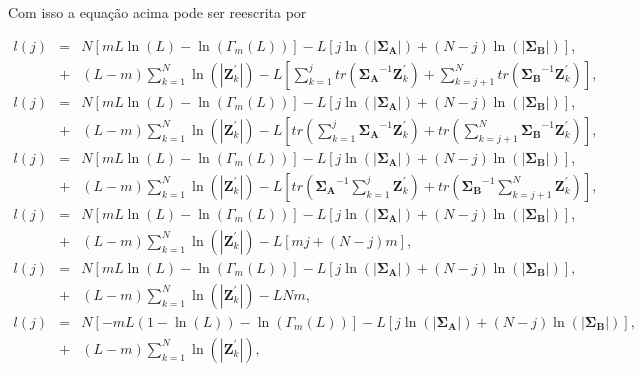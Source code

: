 Com isso a equação acima pode ser reescrita por

\begin{equation*}
\begin{array}{rcl}
	l(j)&=&N\left[mL\ln{\left(L\right)}-\ln{\left(\Gamma_m(L)\right)}\right]-L\left[j\ln{\left(|\mathbf{\Sigma_{A}}|\right)} +(N-j)\ln{\left(|\mathbf{\Sigma_{B}}|\right)}\right], \\
	&+&(L-m)\sum_{k=1}^{N}\ln{\left(|\mathbf{Z}_{k}^{'}|\right)}-L\left[\sum_{k=1}^{j}tr(\mathbf{\Sigma_{A}}^{-1}\mathbf{Z}_{k}^{'})+ \sum_{k=j+1}^{N}tr(\mathbf{\Sigma_{B}}^{-1}\mathbf{Z}_{k}^{'})\right], \\
	l(j)&=&N\left[mL\ln{\left(L\right)}-\ln{\left(\Gamma_m(L)\right)}\right]-L\left[j\ln{\left(|\mathbf{\Sigma_{A}}|\right)} +(N-j)\ln{\left(|\mathbf{\Sigma_{B}}|\right)}\right], \\
	&+&(L-m)\sum_{k=1}^{N}\ln{\left(|\mathbf{Z}_{k}^{'}|\right)}-L\left[tr\left(\sum_{k=1}^{j}\mathbf{\Sigma_{A}}^{-1}\mathbf{Z}_{k}^{'}\right)+tr\left( \sum_{k=j+1}^{N}\mathbf{\Sigma_{B}}^{-1}\mathbf{Z}_{k}^{'}\right)\right], \\
	l(j)&=&N\left[mL\ln{\left(L\right)}-\ln{\left(\Gamma_m(L)\right)}\right]-L\left[j\ln{\left(|\mathbf{\Sigma_{A}}|\right)} +(N-j)\ln{\left(|\mathbf{\Sigma_{B}}|\right)}\right], \\
	&+&(L-m)\sum_{k=1}^{N}\ln{\left(|\mathbf{Z}_{k}^{'}|\right)}-L\left[tr\left(\mathbf{\Sigma_{A}}^{-1}\sum_{k=1}^{j}\mathbf{Z}_{k}^{'}\right)+tr\left( \mathbf{\Sigma_{B}}^{-1}\sum_{k=j+1}^{N}\mathbf{Z}_{k}^{'}\right)\right], \\
	l(j)&=&N\left[mL\ln{\left(L\right)}-\ln{\left(\Gamma_m(L)\right)}\right]-L\left[j\ln{\left(|\mathbf{\Sigma_{A}}|\right)} +(N-j)\ln{\left(|\mathbf{\Sigma_{B}}|\right)}\right], \\
	&+&(L-m)\sum_{k=1}^{N}\ln{\left(|\mathbf{Z}_{k}^{'}|\right)}-L\left[mj+(N-j)m\right], \\
	l(j)&=&N\left[mL\ln{\left(L\right)}-\ln{\left(\Gamma_m(L)\right)}\right]-L\left[j\ln{\left(|\mathbf{\Sigma_{A}}|\right)} +(N-j)\ln{\left(|\mathbf{\Sigma_{B}}|\right)}\right], \\
	&+&(L-m)\sum_{k=1}^{N}\ln{\left(|\mathbf{Z}_{k}^{'}|\right)}-LNm, \\
	l(j)&=&N\left[-mL(1-\ln{\left(L\right)})-\ln{\left(\Gamma_m(L)\right)}\right]-L\left[j\ln{\left(|\mathbf{\Sigma_{A}}|\right)} +(N-j)\ln{\left(|\mathbf{\Sigma_{B}}|\right)}\right], \\
	&+&(L-m)\sum_{k=1}^{N}\ln{\left(|\mathbf{Z}_{k}^{'}|\right)}, \\
\end{array}
\end{equation*}

